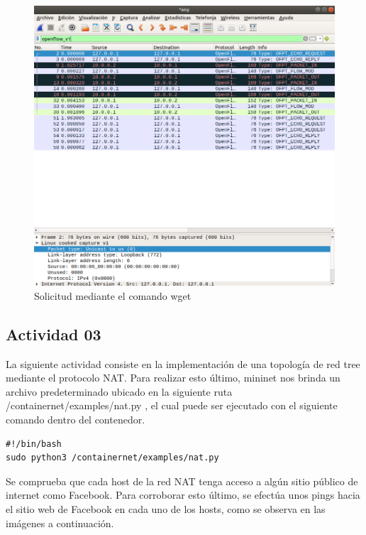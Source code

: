 \documentclass[10pt]{article}
\begin{document}
\begin{multicols}{2}
\begin{figure}[H]
    \centering
    \includegraphics[width=\linewidth]{Imagenes/loopback.png}
    \caption{Solicitud mediante el comando wget}
    \label{fig:item02_loopback}
\end{figure}

\end{multicols}

\newpage

\subsection{Actividad 03}

La siguiente actividad consiste en la implementación de una topología de red tree mediante el protocolo NAT. Para realizar esto último, mininet nos brinda un archivo predeterminado ubicado en la siguiente ruta /containernet/examples/nat.py , el cual puede ser ejecutado con el siguiente comando dentro del contenedor.

\begin{verbatim}
#!/bin/bash
sudo python3 /containernet/examples/nat.py 
\end{verbatim}

Se comprueba que cada host de la red NAT tenga acceso a algún sitio público de internet como Facebook. Para corroborar esto último, se efectúa unos pings hacia el sitio web de Facebook en cada uno de los hosts, como se observa en las imágenes a continuación.
\end{document}
